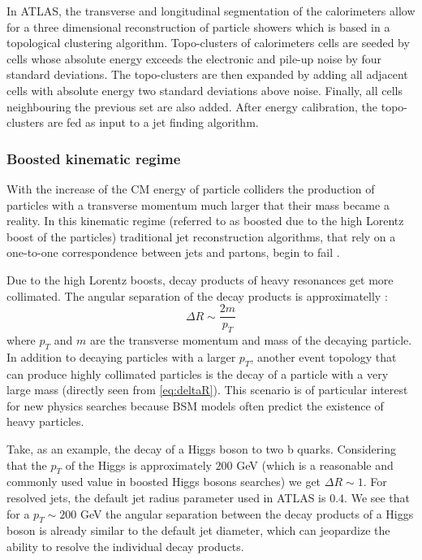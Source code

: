 In ATLAS, the transverse and longitudinal segmentation of the calorimeters allow for a three dimensional reconstruction of particle showers which is based in a topological clustering algorithm. Topo-clusters of calorimeters cells are seeded by cells whose absolute energy exceeds the electronic and pile-up noise by four standard deviations. The topo-clusters are then expanded by adding all adjacent cells with absolute energy two standard deviations above noise. Finally, all cells neighbouring the previous set are also added. After energy calibration, the topo-clusters are fed as input to a jet finding algorithm.  

\subsubsection{Boosted kinematic regime}

With the increase of the CM energy of particle colliders the production of particles with a transverse momentum much larger that their mass became a reality. In this kinematic regime (referred to as boosted due to the high Lorentz boost of the particles) traditional jet reconstruction algorithms, that rely on a one-to-one correspondence between jets and partons, begin to fail \cite{jetsubLHC}. 

Due to the high Lorentz boosts, decay products of heavy resonances get more collimated. The angular separation of the decay products is approximatelly \cite{jetsub}:
\begin{equation}
	\Delta R \sim \frac{2 m}{p_T}
	\label{eq:deltaR}
\end{equation}
where $p_T$ and $m$ are the transverse momentum and mass of the decaying particle. In addition to decaying particles with a larger $p_T$, another event topology that can produce highly collimated particles is the decay of a particle with a very large mass (directly seen from \ref{eq:deltaR}). This scenario is of particular interest for new physics searches because BSM models often predict the existence of heavy particles. 

Take, as an example, the decay of a Higgs boson to two b quarks. Considering that the $p_T$ of the Higgs is approximately $200$ GeV (which is a reasonable and commonly used value in boosted Higgs bosons searches) we get $\Delta R \sim 1$. For resolved jets, the default jet radius parameter used in ATLAS is $0.4$. We see that for a $p_T \sim 200$ GeV the angular separation between the decay products of a Higgs boson is already similar to the default jet diameter, which can jeopardize the ability to resolve the individual decay products.

